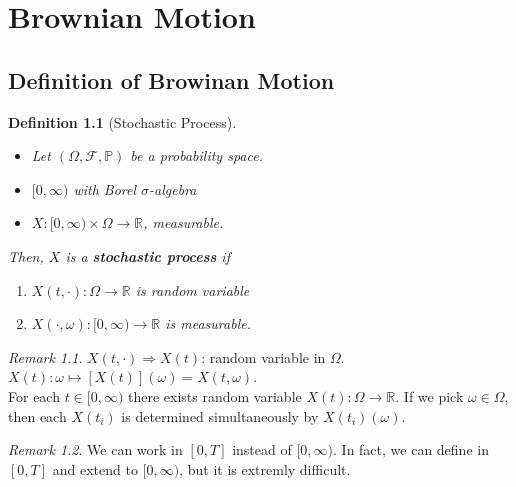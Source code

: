 \documentclass[12pt]{report}
\newcommand{\R}{\mathbb{R}}
\renewcommand{\P}{\mathbb{P}}
\newcommand{\F}{\mathcal{F}}
\renewcommand{\1}{\mathbb{1}}
\renewcommand{\O}{\Omega}
\theoremstyle{break}
\theoremstyle{newdef}
\newtheorem{defn}[thm]{Definition} %
\theoremstyle{remark}
\newtheorem*{rem}{Remark} %
\begin{document}




\setcounter{chapter}{1}

\chapter{Brownian Motion}
\section{Definition of Browinan Motion}

\begin{defn}[Stochastic Process]
\leavevmode
\vspace{-6mm}
\begin{itemize}
\item Let $(\O, \F, \P)$ be a probability space.
\item $[0,\infty)$ with Borel $\sigma$-algebra
\item $X:[0,\infty) \times \O \rightarrow \R$, measurable.
\end{itemize}
Then, $X$ is a \textbf{stochastic process} if
\begin{enumerate}
\item $X(t,\cdot) : \O \rightarrow \R$ is random variable
\item $X(\cdot,\omega) : [0,\infty) \rightarrow \R$ is measurable.
\end{enumerate}
\end{defn}



\begin{rem}
$X(t,\cdot) \Rightarrow X(t)$: random variable in $\O$.
$X(t) : \omega \mapsto [X(t)](\omega) = X(t,\omega)$.\\
For each $t \in [0,\infty)$ there exists random variable $X(t) : \O\rightarrow \R$.
If we pick $\omega \in \O$, then each $X(t_i)$ is determined simultaneously by $X(t_i)(\omega)$.
\end{rem}


\begin{rem}
We can work in $[0,T]$ instead of $[0,\infty)$.
In fact, we can define in $[0,T]$ and extend to $[0,\infty)$, but it is extremly difficult.
\end{rem}
\end{document}
